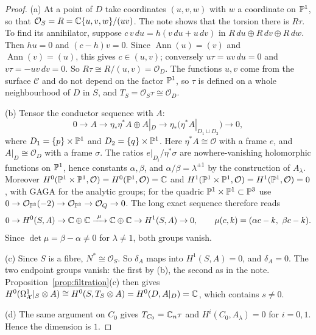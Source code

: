 \begin{proof}
(a) At a point of $D$ take coordinates $(u,v,w)$ with $w$ a coordinate on $\mathbb{P}^1$, so that $\mathcal O_{S}=R=\mathbb{C}\{u,v,w\}/(uv)$. The note shows that the torsion there is $R\tau$. To find its annihilator, suppose $c\,v\,du=h(v\,du+u\,dv)$ in $R\,du\oplus R\,dv\oplus R\,dw$. Then $hu=0$ and $(c-h)v=0$. Since $\operatorname{Ann}(u)=(v)$ and $\operatorname{Ann}(v)=(u)$, this gives $c\in(u,v)$; conversely $u\tau=uv\,du=0$ and $v\tau=-uv\,dv=0$. So $R\tau\cong R/(u,v)=\mathcal O_{D}$. The functions $u,v$ come from the surface $\mathcal C$ and do not depend on the factor $\mathbb{P}^1$, so $\tau$ is defined on a whole neighbourhood of $D$ in $S$, and $T_S=\mathcal O_S\tau\cong\mathcal O_D$.

(b) Tensor the conductor sequence with $A$:
\[
0\to A\to\eta_*\eta^*A\oplus A|_D\to\eta_*\bigl(\eta^*A|_{D_1\sqcup D_2}\bigr)\to0,
\]
where $D_1=\{p\}\times\mathbb{P}^1$ and $D_2=\{q\}\times\mathbb{P}^1$. Here $\eta^*A\cong\mathcal O$ with a frame $e$, and $A|_D\cong\mathcal O_D$ with a frame $\sigma$. The ratios $e|_{D_i}/\eta^*\sigma$ are nowhere-vanishing holomorphic functions on $\mathbb{P}^1$, hence constants $\alpha,\beta$, and $\alpha/\beta=\lambda^{\pm1}$ by the construction of $A_\lambda$. Moreover $H^0(\mathbb{P}^1\times\mathbb{P}^1,\mathcal O)=H^0(\mathbb{P}^1,\mathcal O)=\mathbb{C}$ and $H^1(\mathbb{P}^1\times\mathbb{P}^1,\mathcal O)=H^1(\mathbb{P}^1,\mathcal O)=0$ \cite[Thm.~III.5.1]{Har77}, with GAGA \cite{Ser56} for the analytic groups; for the quadric $\mathbb{P}^1\times\mathbb{P}^1\subset\mathbb{P}^3$ use $0\to\mathcal O_{\mathbb{P}^3}(-2)\to\mathcal O_{\mathbb{P}^3}\to\mathcal O_Q\to0$. The long exact sequence therefore reads
\[
0\to H^0(S,A)\to\mathbb{C}\oplus\mathbb{C}\xrightarrow{\ \mu\ }\mathbb{C}\oplus\mathbb{C}\to H^1(S,A)\to0,\qquad \mu(c,k)=(\alpha c-k,\ \beta c-k).
\]
Since $\det\mu=\beta-\alpha\neq0$ for $\lambda\neq1$, both groups vanish.

(c) Since $S$ is a fibre, $N^*\cong\mathcal O_S$. So $\delta_A$ maps into $H^1(S,A)=0$, and $\delta_A=0$. The two endpoint groups vanish: the first by (b), the second as in the note. Proposition~\ref{prop:filtration}(c) then gives $H^0(\Omega^1_{\mathcal X}|_S\otimes A)\cong H^0(S,T_S\otimes A)=H^0(D,A|_D)=\mathbb{C}$, which contains $s\neq0$.

(d) The same argument on $C_0$ gives $T_{C_0}=\mathbb{C}_n\tau$ and $H^i(C_0,A_\lambda)=0$ for $i=0,1$. Hence the dimension is $1$.


\end{proof}
